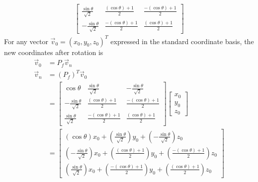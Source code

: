 \begin{solution}
\begin{align*}
\begin{bmatrix}
\frac{\sin{\theta}}{\sqrt{2}} & \frac{(\cos{\theta}) + 1}{2} & \frac{-(\cos{\theta}) + 1}{2} \\
-\frac{\sin{\theta}}{\sqrt{2}} & \frac{-(\cos{\theta}) + 1}{2} & \frac{(\cos{\theta}) + 1}{2}
\end{bmatrix}
\end{align*}
For any vector $\vec{v}_0 = (x_0,y_0,z_0)^T$ expressed in the standard coordinate basis, the new coordinates after rotation is
\begin{align*}
\vec{v}_0 &= P_f \vec{v}_n \\
\vec{v}_n &= (P_f)^T\vec{v}_0 \\
&=
\begin{bmatrix}
\cos{\theta} & \frac{\sin{\theta}}{\sqrt{2}} & -\frac{\sin{\theta}}{\sqrt{2}} \\
-\frac{\sin{\theta}}{\sqrt{2}} & \frac{(\cos{\theta}) + 1}{2} & \frac{-(\cos{\theta}) + 1}{2} \\
\frac{\sin{\theta}}{\sqrt{2}} & \frac{-(\cos{\theta}) + 1}{2} & \frac{(\cos{\theta}) + 1}{2}
\end{bmatrix}
\begin{bmatrix}
x_0 \\
y_0 \\
z_0
\end{bmatrix} \\
&=
\begin{bmatrix}
(\cos{\theta})x_0 + (\frac{\sin{\theta}}{\sqrt{2}})y_0 + (-\frac{\sin{\theta}}{\sqrt{2}})z_0 \\
(-\frac{\sin{\theta}}{\sqrt{2}})x_0 + (\frac{(\cos{\theta}) + 1}{2})y_0 + (\frac{-(\cos{\theta}) + 1}{2})z_0 \\
(\frac{\sin{\theta}}{\sqrt{2}})x_0 + (\frac{-(\cos{\theta}) + 1}{2})y_0 + (\frac{(\cos{\theta}) + 1}{2})z_0
\end{bmatrix}
\end{align*}
\end{solution}
